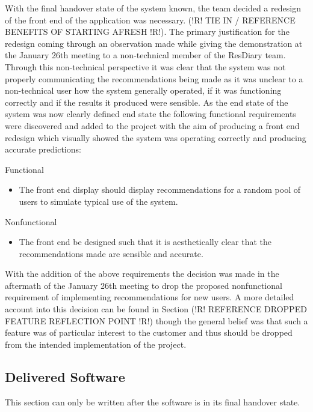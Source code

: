\documentclass{l3proj}
\begin{document}
With the final handover state of the system known, the team decided a redesign of the front end of the application was necessary. (!R! TIE IN / REFERENCE BENEFITS OF STARTING AFRESH !R!). The primary justification for the redesign coming through an observation made while giving the demonstration at the January 26th meeting to a non-technical member of the ResDiary team. Through this non-technical perspective it was clear that the system was not properly communicating the recommendations being made as it was unclear to a non-technical user how the system generally operated, if it was functioning correctly and if the results it produced were sensible. As the end state of the system was now clearly defined end state the following functional requirements were discovered and added to the project with the aim of producing a front end redesign which visually showed the system was operating correctly and producing accurate predictions:

Functional
\begin{itemize}
\item The front end display should display recommendations for a random pool of users to simulate typical use of the system.
\end{itemize}

Nonfunctional
\begin{itemize}
\item The front end be designed such that it is aesthetically clear that the recommendations made are sensible and accurate.
\end{itemize}

With the addition of the above requirements the decision was made in the aftermath of the January 26th meeting to drop the proposed nonfunctional requirement of implementing recommendations for new users. A more detailed account into this decision can be found in Section (!R! REFERENCE DROPPED FEATURE REFLECTION POINT !R!) though the general belief was that such a feature was of particular interest to the customer and thus should be dropped from the intended implementation of the project.


\subsection{Delivered Software}
\label{sec:finsoftware}
This section can only be written after the software is in its final handover state.
\newpage
\end{document}
